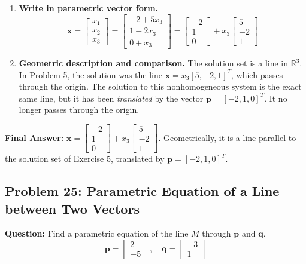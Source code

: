 \documentclass[11pt]{article}
\begin{document}
\begin{enumerate}
\begin{align*}
        x_2 + 2x_3 = 1 &\implies x_2 = 1 - 2x_3 \\
        x_3 &\text{ is free}
    \end{align*}
    \item \textbf{Write in parametric vector form.}
    \[
    \mathbf{x} = \begin{bmatrix} x_1 \\ x_2 \\ x_3 \end{bmatrix} = \begin{bmatrix} -2 + 5x_3 \\ 1 - 2x_3 \\ 0 + x_3 \end{bmatrix} = \begin{bmatrix} -2 \\ 1 \\ 0 \end{bmatrix} + x_3 \begin{bmatrix} 5 \\ -2 \\ 1 \end{bmatrix}
    \]
    \item \textbf{Geometric description and comparison.} The solution set is a line in $\mathbb{R}^3$. In Problem 5, the solution was the line $\mathbf{x} = x_3[5, -2, 1]^T$, which passes through the origin. The solution to this nonhomogeneous system is the exact same line, but it has been \textit{translated} by the vector $\mathbf{p} = [-2, 1, 0]^T$. It no longer passes through the origin.
\end{enumerate}
\textbf{Final Answer:} $\mathbf{x} = \begin{bmatrix} -2 \\ 1 \\ 0 \end{bmatrix} + x_3 \begin{bmatrix} 5 \\ -2 \\ 1 \end{bmatrix}$. Geometrically, it is a line parallel to the solution set of Exercise 5, translated by $\mathbf{p} = [-2, 1, 0]^T$.

\subsection*{Problem 25: Parametric Equation of a Line between Two Vectors}
\textbf{Question:} Find a parametric equation of the line $M$ through $\mathbf{p}$ and $\mathbf{q}$.
\[ \mathbf{p} = \begin{bmatrix} 2 \\ -5 \end{bmatrix}, \quad \mathbf{q} = \begin{bmatrix} -3 \\ 1 \end{bmatrix} \]
\end{document}
